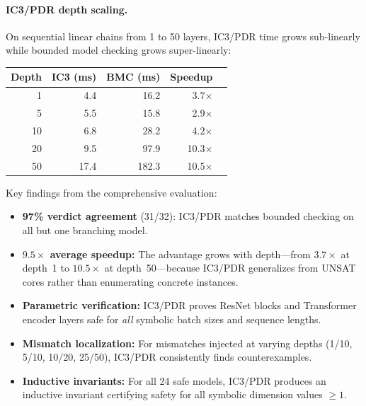\documentclass[11pt]{article}
\begin{document}
\paragraph{IC3/PDR depth scaling.}
On sequential linear chains from 1 to 50 layers, IC3/PDR time grows
sub-linearly while bounded model checking grows super-linearly:

\begin{center}
\small
\begin{tabular}{@{}rrrrr@{}}
\toprule
\textbf{Depth} & \textbf{IC3 (ms)} & \textbf{BMC (ms)} & \textbf{Speedup} \\
\midrule
 1 &  4.4 &  16.2 &  3.7$\times$ \\
 5 &  5.5 &  15.8 &  2.9$\times$ \\
10 &  6.8 &  28.2 &  4.2$\times$ \\
20 &  9.5 &  97.9 & 10.3$\times$ \\
50 & 17.4 & 182.3 & 10.5$\times$ \\
\bottomrule
\end{tabular}
\end{center}

Key findings from the comprehensive evaluation:
\begin{itemize}[leftmargin=2em]
  \item \textbf{97\% verdict agreement} (31/32): IC3/PDR matches
    bounded checking on all but one branching model.
  \item \textbf{$9.5\times$ average speedup:} The advantage grows
    with depth---from $3.7\times$ at depth~1 to $10.5\times$ at
    depth~50---because IC3/PDR generalizes from UNSAT cores
    rather than enumerating concrete instances.
  \item \textbf{Parametric verification:} IC3/PDR proves
    ResNet blocks and Transformer encoder layers safe for \emph{all}
    symbolic batch sizes and sequence lengths.
  \item \textbf{Mismatch localization:} For mismatches injected at
    varying depths (1/10, 5/10, 10/20, 25/50), IC3/PDR consistently
    finds counterexamples.
  \item \textbf{Inductive invariants:} For all 24 safe models,
    IC3/PDR produces an inductive invariant certifying safety for
    all symbolic dimension values $\geq 1$.
\end{itemize}
\end{document}
